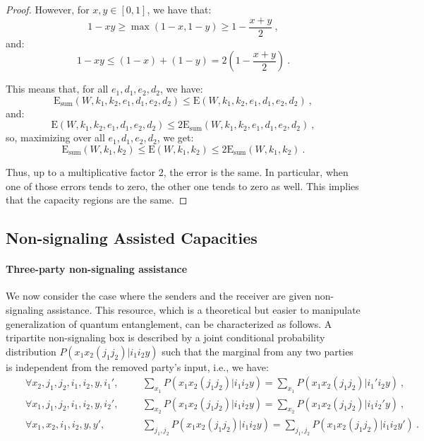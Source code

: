 \begin{proof}
However, for $x,y \in [0,1]$, we have that:
\[1-xy \geq \max\left(1-x,1-y\right) \geq 1-\frac{x+y}{2} \ , \]
and:
\[1-xy \leq (1-x) + (1-y) = 2  \left(1-\frac{x+y}{2}\right) \ . \]

This means that, for all $e_1,d_1,e_2,d_2$, we have:
\[ \mathrm{E}_{\text{sum}}(W,k_1,k_2,e_1,d_1,e_2,d_2) \leq \mathrm{E}(W,k_1,k_2,e_1,d_1,e_2,d_2) \ ,\]
and:
\[ \mathrm{E}(W,k_1,k_2,e_1,d_1,e_2,d_2) \leq 2\mathrm{E}_{\text{sum}}(W,k_1,k_2,e_1,d_1,e_2,d_2) \ ,\]
so, maximizing over all $e_1,d_1,e_2,d_2$, we get:
\[ \mathrm{E}_{\text{sum}}(W,k_1,k_2) \leq \mathrm{E}(W,k_1,k_2) \leq 2\mathrm{E}_{\text{sum}}(W,k_1,k_2) \ .\]

Thus, up to a multiplicative factor $2$, the error is the same. In particular, when one of those errors tends to zero, the other one tends to zero as well. This implies that the capacity regions are the same.
\end{proof}

\subsection{Non-signaling Assisted Capacities}
\paragraph{Three-party non-signaling assistance} We now consider the case where the senders and the receiver are given non-signaling assistance. This resource, which is a theoretical but easier to manipulate generalization of quantum entanglement, can be characterized as follows. A tripartite non-signaling box is described by a joint conditional probability distribution $P(x_1x_2(j_1j_2)|i_1i_2y)$ such that the marginal from any two parties is independent from the removed party's input, i.e., we have:
\begin{equation}
  \begin{aligned}
    &&\forall x_2,j_1,j_2,i_1,i_2,y,i_1', &&&\sum_{x_1} P(x_1x_2(j_1j_2)|i_1i_2y) = \sum_{x_1} P(x_1x_2(j_1j_2)|i_1'i_2y) \ ,\\
    &&\forall x_1,j_1,j_2,i_1,i_2,y,i_2', &&&\sum_{x_2} P(x_1x_2(j_1j_2)|i_1i_2y) = \sum_{x_2} P(x_1x_2(j_1j_2)|i_1i_2'y) \ ,\\
    &&\forall x_1,x_2,i_1,i_2,y,y', &&&\sum_{j_1,j_2} P(x_1x_2(j_1j_2)|i_1i_2y) = \sum_{j_1,j_2} P(x_1x_2(j_1j_2)|i_1i_2y') \ .\\
  \end{aligned}
\end{equation}

